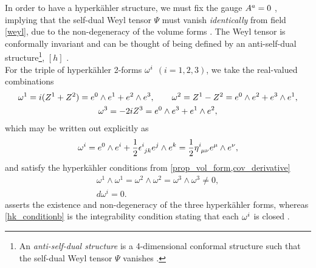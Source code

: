 \documentclass[a4paper,12pt, onecolumn, notitlepage]{article}
\theoremstyle{definition}
\theoremstyle{remark}
\newcommand{\w}{\omega}
\newcommand{\m}{\mu}
\newcommand{\n}{\nu}
\newcommand{\e}{\epsilon}
\newcommand{\HK}{hyperk\"ahler }
\newcommand{\hooft}[3]{\eta\indices{^{#1}_{#2}_{#3}}}
\begin{document}
In order to have a \HK structure, we must fix the gauge $A\indices{^a}=0$ \cite{capovilla_1991}, implying that the self-dual Weyl tensor $\Psi$ must vanish \emph{identically} from field \cref{weyl}, due to the non-degeneracy of the volume forms \cite{capovilla_1993}. The Weyl tensor is conformally invariant and can be thought of being defined by an anti-self-dual structure\footnote{An \emph{anti-self-dual structure} is a 4-dimensional conformal structure such that the self-dual Weyl tensor $\Psi$ vanishes \cite{solitons}.}, $[h]$ \cite{solitons}.\\
For the triple of \HK 2-forms $\w\indices{^i}$ $(i=1,2,3)$, we take the real-valued combinations
\begin{gather*}
\w\indices{^1} = i(Z^{1}+Z^{2}) = e^{0}\wedge e^{1}+e^{2}\wedge e^{3},\qquad \w\indices{^2}= Z^{1}-Z^{2}=e^{0}\wedge e^{2}+e^{3}\wedge e^{1},\\\w\indices{^3} = -2iZ\indices{^3}=e^{0}\wedge e^{3}+e^{1}\wedge e^{2},
\end{gather*}
which may be written out explicitly as
\begin{equation}
	\label{sd_form}
	\w^{i} = e^{0}\wedge e^{i} + \frac{1}{2}\e\indices{^i_j_k}e^{j}\wedge e^{k} = \frac{1}{2}\hooft{i}{\m}{\n}e^{\m}\wedge e^{\n},
\end{equation}
and satisfy the \HK conditions from  \cref{prop_vol_form,cov_derivative} 
\begin{subequations}
	\begin{gather}
	\label{hk_conditiona}
	\w^{1}\wedge\w^{1} = \w^{2}\wedge\w^{2} =\w^{3}\wedge\w^{3} \neq 0,\\
	\label{hk_conditionb}
	d\w^{i} = 0. 
	\end{gather}
\end{subequations}
 asserts the existence and non-degeneracy of the three \HK forms, whereas \cref{hk_conditionb} is the integrability condition stating that each $\w\indices{^i}$ is closed \cite{solitons}.\\
\end{document}
